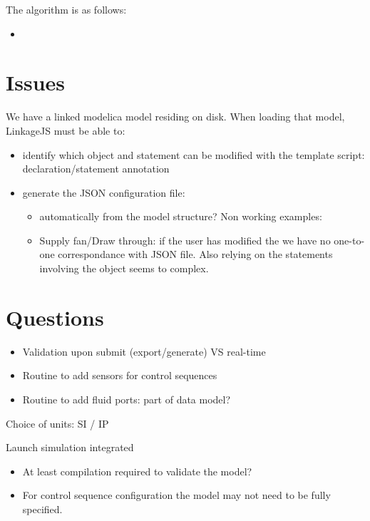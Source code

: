 \documentclass[letterpaper,10pt, openany,english]{sphinxmanual}
\begin{document}
The algorithm is as follows:
\begin{itemize}
\item {} 
\end{itemize}


\chapter{Issues}
\label{\detokenize{requirements:issues}}
We have a linked modelica model residing on disk. When loading that model, LinkageJS must be able to:
\begin{itemize}
\item {} 
identify which object and  statement can be modified with the template script: declaration/statement annotation 

\item {} 
generate the JSON configuration file:
\begin{itemize}
\item {} 
automatically from the model structure? Non working examples:

\item {} 
Supply fan/Draw through: if the user has modified the  we have no one-to-one correspondance with JSON file. Also relying on the  statements involving the object seems to complex.

\end{itemize}

\end{itemize}


\chapter{Questions}
\label{\detokenize{requirements:questions}}\begin{itemize}
\item {} 
Validation upon submit (export/generate) VS real-time

\item {} 
Routine to add sensors for control sequences

\item {} 
Routine to add fluid ports: part of data model?

\end{itemize}

Choice of units: SI / IP

Launch simulation integrated
\begin{itemize}
\item {} 
At least compilation required to validate the model?

\item {} 
For control sequence configuration the model may not need to be fully specified.

\end{itemize}
\end{document}
